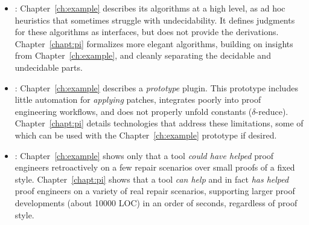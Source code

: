 \begin{itemize}
\item {}: Chapter~\ref{ch:example} describes its algorithms at a high level, as ad hoc heuristics
that sometimes struggle with undecidability.
It defines judgments for these algorithms as interfaces, but does not provide the derivations.
Chapter~\ref{chapt:pi} formalizes more elegant algorithms, building on insights from Chapter~\ref{ch:example},
and cleanly separating the decidable and undecidable parts.
\item {}:
Chapter~\ref{ch:example} describes a \textit{prototype} plugin.
This prototype includes little automation for \textit{applying} patches,
integrates poorly into proof engineering workflows,
and does not properly unfold constants ($\delta$-reduce).
Chapter~\ref{chapt:pi} details technologies that address these limitations,
some of which can be used with the Chapter~\ref{ch:example} prototype if desired.
\item {}:
Chapter~\ref{ch:example} shows only that a tool \textit{could have helped} proof engineers retroactively
on a few repair scenarios over small proofs of a fixed style.
Chapter~\ref{chapt:pi} shows that a tool
\textit{can help} and in fact \textit{has helped} proof engineers on a variety of real repair scenarios,
supporting larger proof developments (about 10000 LOC) in an order of seconds,
regardless of proof style.
\end{itemize}

